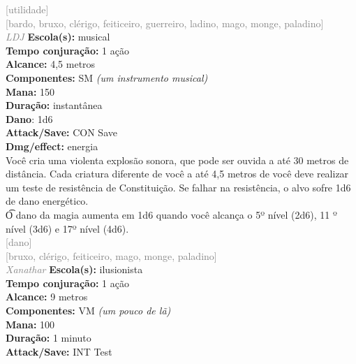 \documentclass{RPG_Adventure}[2021/10/20]
\begin{document}
{\scriptsize \textcolor{gray}{[utilidade]\\}}
{\scriptsize \textcolor{gray}{[bardo, bruxo, clérigo, feiticeiro, guerreiro, ladino, mago, monge, paladino]\\}}
{\tiny \textcolor{gray}{\textit{LDJ}}}
{\small \t \textbf{Escola(s):} musical\\\t \textbf{Tempo conjuração:} 1 ação\\\t \textbf{Alcance:} 4,5 metros\\\t \textbf{Componentes:} SM \textit{(um instrumento musical)}\\\t \textbf{Mana:} 150\\\t \textbf{Duração:} instantânea\\\t \textbf{Dano}: 1d6\\\t \textbf{Attack/Save:} CON Save\\\t \textbf{Dmg/effect:} energia\\}
{\normalsize Você cria uma violenta explosão sonora, que pode ser ouvida a até 30 metros de distância. Cada criatura diferente de você a até 4,5 metros de você deve realizar um teste de resistência de Constituição. Se falhar na resistência, o alvo sofre 1d6 de dano energético.\\\t O dano da magia aumenta em 1d6 quando você alcança o 5º nível (2d6), 11 º nível (3d6) e 17º nível (4d6).\\}
{\scriptsize \textcolor{gray}{[dano]\\}}
{\scriptsize \textcolor{gray}{[bruxo, clérigo, feiticeiro, mago, monge, paladino]\\}}
{\tiny \textcolor{gray}{\textit{Xanathar}}}
{\small \t \textbf{Escola(s):} ilusionista\\\t \textbf{Tempo conjuração:} 1 ação\\\t \textbf{Alcance:} 9 metros\\\t \textbf{Componentes:} VM \textit{(um pouco de lã)}\\\t \textbf{Mana:} 100\\\t \textbf{Duração:} 1 minuto\\\t \textbf{Attack/Save:} INT Test\\}
\end{document}
